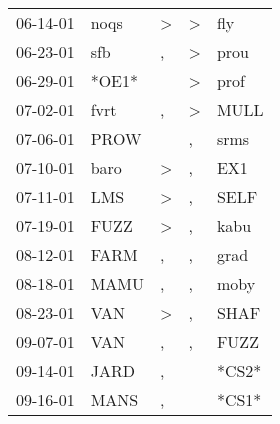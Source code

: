 \begin{supertabular}{p{0.07\textwidth}p{0.06\textwidth}p{0.02\textwidth}p{0.02\textwidth}p{0.06\textwidth}}
          06-14-01\textsuperscript{} &           noqs\textsuperscript{} &     \textgreater &     \textgreater &            fly\textsuperscript{} \\
          06-23-01\textsuperscript{} &            sfb\textsuperscript{} &                , &     \textgreater &           prou\textsuperscript{} \\
          06-29-01\textsuperscript{} &                            *OE1* &                  &     \textgreater &           prof\textsuperscript{} \\
          07-02-01\textsuperscript{} &           fvrt\textsuperscript{} &                , &     \textgreater &           MULL\textsuperscript{} \\
          07-06-01\textsuperscript{} &           PROW\textsuperscript{} &                  &                , &           srms\textsuperscript{} \\
          07-10-01\textsuperscript{} &           baro\textsuperscript{} &     \textgreater &                , &            EX1\textsuperscript{} \\
          07-11-01\textsuperscript{} &            LMS\textsuperscript{} &     \textgreater &                , &           SELF\textsuperscript{} \\
          07-19-01\textsuperscript{} &           FUZZ\textsuperscript{} &     \textgreater &                , &           kabu\textsuperscript{} \\
          08-12-01\textsuperscript{} &           FARM\textsuperscript{} &                , &                , &           grad\textsuperscript{} \\
          08-18-01\textsuperscript{} &           MAMU\textsuperscript{} &                , &                , &           moby\textsuperscript{} \\
          08-23-01\textsuperscript{} &            VAN\textsuperscript{} &     \textgreater &                , &           SHAF\textsuperscript{} \\
          09-07-01\textsuperscript{} &            VAN\textsuperscript{} &                , &                , &           FUZZ\textsuperscript{} \\
          09-14-01\textsuperscript{} &           JARD\textsuperscript{} &                , &                  &                            *CS2* \\
          09-16-01\textsuperscript{} &           MANS\textsuperscript{} &                , &                  &                            *CS1* \\

\end{supertabular}
